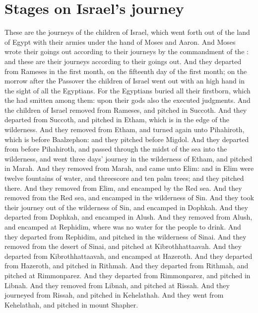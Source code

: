 \section*{Stages on Israel's journey}
\begin{biblechapter} %
\verse These are the journeys of the children of Israel, which went forth out of the land of Egypt with their armies under the hand of Moses and Aaron.
\verse And Moses wrote their goings out according to their journeys by the commandment of the \LORD: and these are their journeys according to their goings out.
\verse And they departed from Rameses in the first month, on the fifteenth day of the first month; on the morrow after the Passover the children of Israel went out with an high hand in the sight of all the Egyptians.
\verse For the Egyptians buried all their firstborn, which the \LORD had smitten among them: upon their gods also the \LORD executed judgments.
\verse And the children of Israel removed from Rameses, and pitched in Succoth.
\verse And they departed from Succoth, and pitched in Etham, which is in the edge of the wilderness.
\verse And they removed from Etham, and turned again unto Pihahiroth, which is before Baalzephon: and they pitched before Migdol.
\verse And they departed from before Pihahiroth, and passed through the midst of the sea into the wilderness, and went three days' journey in the wilderness of Etham, and pitched in Marah.
\verse And they removed from Marah, and came unto Elim: and in Elim were twelve fountains of water, and threescore and ten palm trees; and they pitched there.
\verse And they removed from Elim, and encamped by the Red sea.
\verse And they removed from the Red sea, and encamped in the wilderness of Sin.
\verse And they took their journey out of the wilderness of Sin, and encamped in Dophkah.
\verse And they departed from Dophkah, and encamped in Alush.
\verse And they removed from Alush, and encamped at Rephidim, where was no water for the people to drink.
\verse And they departed from Rephidim, and pitched in the wilderness of Sinai.
\verse And they removed from the desert of Sinai, and pitched at Kibrothhattaavah.
\verse And they departed from Kibrothhattaavah, and encamped at Hazeroth.
\verse And they departed from Hazeroth, and pitched in Rithmah.
\verse And they departed from Rithmah, and pitched at Rimmonparez.
\verse And they departed from Rimmonparez, and pitched in Libnah.
\verse And they removed from Libnah, and pitched at Rissah.
\verse And they journeyed from Rissah, and pitched in Kehelathah.
\verse And they went from Kehelathah, and pitched in mount Shapher.

\end{biblechapter}
